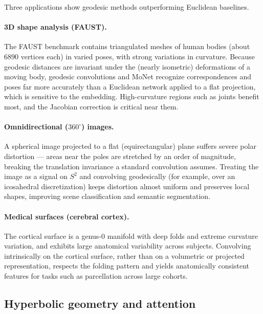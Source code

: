 Three applications show geodesic methods outperforming Euclidean baselines.

\paragraph{3D shape analysis (FAUST).}
The FAUST benchmark contains triangulated meshes of human bodies (about $6890$
vertices each) in varied poses, with strong variations in curvature. Because
geodesic distances are invariant under the (nearly isometric) deformations of a
moving body, geodesic convolutions and MoNet recognize correspondences and poses
far more accurately than a Euclidean network applied to a flat projection,
which is sensitive to the embedding. High-curvature regions such as joints
benefit most, and the Jacobian correction is critical near them.

\paragraph{Omnidirectional ($360^\circ$) images.}
A spherical image projected to a flat (equirectangular) plane suffers severe
polar distortion --- areas near the poles are stretched by an order of
magnitude, breaking the translation invariance a standard convolution assumes.
Treating the image as a signal on $S^2$ and convolving geodesically (for
example, over an icosahedral discretization) keeps distortion almost uniform and
preserves local shapes, improving scene classification and semantic
segmentation.

\paragraph{Medical surfaces (cerebral cortex).}
The cortical surface is a genus-0 manifold with deep folds and extreme curvature
variation, and exhibits large anatomical variability across subjects.
Convolving intrinsically on the cortical surface, rather than on a volumetric or
projected representation, respects the folding pattern and yields anatomically
consistent features for tasks such as parcellation across large cohorts.

\subsection{Hyperbolic geometry and attention}
\label{subsec:geo:hyperbolic}

